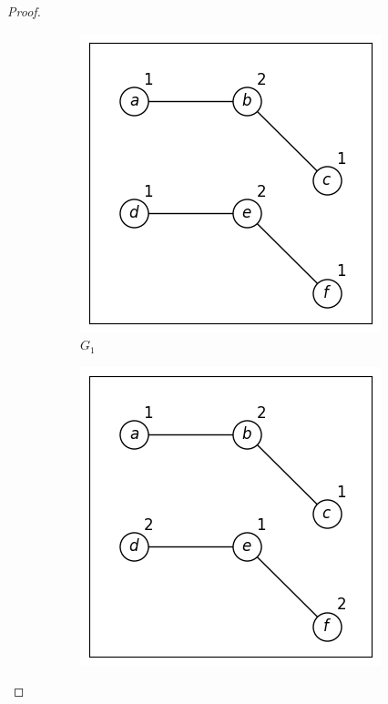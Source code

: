 \documentclass{article}
\begin{document}
\begin{proof}
    \begin{figure}[ht]
        \centering
        \begin{subfigure}[b]{0.3\textwidth}
            \includegraphics[width=\textwidth]{figures/lwl vs wl-ed/G1.png}
            \caption{$G_1$}
        \end{subfigure}
        \hfill
        \begin{subfigure}[b]{0.3\textwidth}
            \includegraphics[width=\textwidth]{figures/lwl vs wl-ed/G2.png}

\end{subfigure}
\end{figure}
\end{proof}
\end{document}

